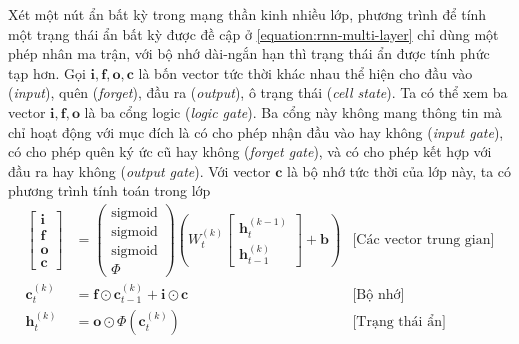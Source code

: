 Xét một nút ẩn bất kỳ trong mạng thần kinh nhiều lớp, phương trình để tính một trạng thái ẩn bất kỳ được đề cập ở \ref{equation:rnn-multi-layer} chỉ dùng một phép nhân ma trận, với bộ nhớ dài-ngắn hạn thì trạng thái ẩn được tính phức tạp hơn. Gọi $\mathbf{i,f,o,c}$ là bốn vector tức thời khác nhau thể hiện cho đầu vào (\textit{input}), quên (\textit{forget}), đầu ra (\textit{output}), ô trạng thái (\textit{cell state}). Ta có thể xem ba vector $\mathbf{i,f,o}$ là ba cổng logic (\textit{logic gate}). Ba cổng này không mang thông tin mà chỉ hoạt động với mục đích là có cho phép nhận đầu vào hay không (\textit{input gate}), có cho phép quên ký ức cũ hay không (\textit{forget gate}), và có cho phép kết hợp với đầu ra hay không (\textit{output gate}). Với vector $\mathbf c$ là bộ nhớ tức thời của lớp này, ta có phương trình tính toán trong lớp
\begin{align}
    \begin{bmatrix}
        \mathbf i \\
        \mathbf f \\
        \mathbf o \\
        \mathbf c
    \end{bmatrix}
                      & =\begin{pmatrix}
                             \text{sigmoid} \\
                             \text{sigmoid} \\
                             \text{sigmoid} \\
                             \Phi
                         \end{pmatrix}
    \left(W^{(k)}_t
    \begin{bmatrix}
            \mathbf h_{t}^{(k-1)} \\
            \mathbf h_{t-1}^{(k)}
        \end{bmatrix} + \mathbf b
    \right)           & \text{[Các vector trung gian]}                                                        \\
    \mathbf c_t^{(k)} & =\mathbf f\odot\mathbf c_{t-1}^{(k)}+\mathbf i\odot\mathbf c & \text{[Bộ nhớ]}        \\
    \mathbf h_t^{(k)} & =\mathbf o\odot\Phi(\mathbf c_t^{(k)})                       & \text{[Trạng thái ẩn]}
\end{align}

